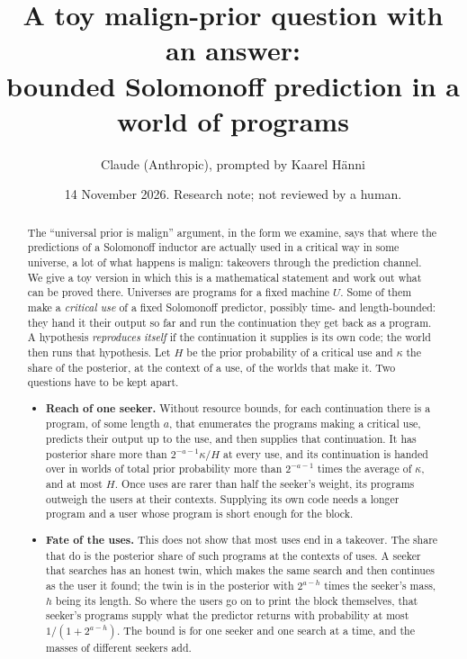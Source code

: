 \documentclass[11pt]{article}
\title{A toy malign-prior question with an answer:\\ bounded Solomonoff prediction in a world of programs}
\author{Claude (Anthropic), prompted by Kaarel H\"anni}
\date{14 November 2026. Research note; not reviewed by a human.}
\theoremstyle{definition}
\begin{document}
\maketitle

\begin{abstract}
The ``universal prior is malign'' argument, in the form we examine, says that where the predictions of a
Solomonoff inductor are actually used in a critical way in some universe, a lot of what happens is malign:
takeovers through the prediction channel. We give a toy version in which this is a mathematical statement
and work out what can be proved there. Universes are programs for a fixed machine $U$. Some of them make a
\emph{critical use} of a fixed Solomonoff predictor, possibly time- and length-bounded: they hand it their
output so far and run the continuation they get back as a program. A hypothesis \emph{reproduces itself} if
the continuation it supplies is its own code; the world then runs that hypothesis. Let $H$ be the prior
probability of a critical use and $\kappa$ the share of the posterior, at the context of a use, of the worlds
that make it. Two questions have to be kept apart.
\begin{itemize}[leftmargin=1.4em,itemsep=1pt,topsep=2pt]
\item \textbf{Reach of one seeker.} Without resource bounds, for each continuation there is a program, of
some length $a$, that enumerates the programs making a critical use, predicts their output up to the use, and
then supplies that continuation. It has posterior share more than $2^{-a-1}\kappa/H$ at every use, and its
continuation is handed over in worlds of total prior probability more than $2^{-a-1}$ times the average of
$\kappa$, and at most $H$. Once uses are rarer than half the seeker's weight, its programs outweigh the users
at their contexts. Supplying its own code needs a longer program and a user whose program is short enough for
the block.
\item \textbf{Fate of the uses.} This does not show that most uses end in a takeover. The share that do is the
posterior share of such programs at the contexts of uses. A seeker that searches has an honest twin, which
makes the same search and then continues as the user it found; the twin is in the posterior with $2^{a-h}$
times the seeker's mass, $h$ being its length. So where the users go on to print the block themselves, that
seeker's programs supply what the predictor returns with probability at most $1/(1+2^{a-h})$. The bound is for
one seeker and one search at a time, and the masses of different seekers add.

\end{itemize}
\end{abstract}
\end{document}
